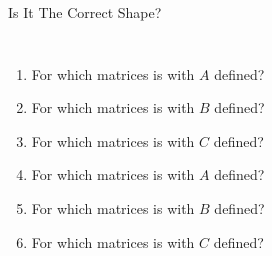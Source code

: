 \documentclass[xcoler=dvipsnames, aspectratio=169]{beamer}
\begin{document}
\begin{frame}{Is It The Correct Shape?}
\begin{columns}
                \pause
                \vspace{100pt}
            \vspace{-50pt}
            \begin{enumerate}
                \item For which matrices is  with $A$ defined?\pause
                \item For which matrices is  with $B$ defined?\pause
                \item For which matrices is  with $C$ defined?\pause
                \item For which matrices is  with $A$ defined?\pause
                \item For which matrices is  with $B$ defined?\pause
                \item For which matrices is  with $C$ defined?
            \end{enumerate}
        \end{columns}
    \end{frame}
\end{document}
